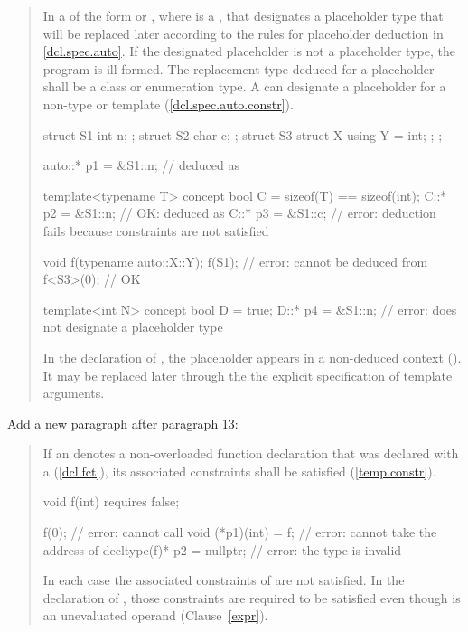 \begin{quote}
\setcounter{Paras}{11}
\pnum
In a  of the form  or
, where  is a ,
that  designates a placeholder type that 
will be replaced later according to the rules for placeholder deduction in
\ref{dcl.spec.auto}.
%
If the designated placeholder is not a placeholder type, the program is
ill-formed.
% 
The replacement type deduced for a placeholder shall be a class or
enumeration type.
% 
\enternote
A  can designate a placeholder for
a non-type or template (\ref{dcl.spec.auto.constr}).
\exitnote
% 
\enterexample
\begin{codeblock}
struct S1 { int n; };
struct S2 { char c; };
struct S3 { struct X { using Y = int; }; };

auto::* p1 = &S1::n; //  deduced as 

template<typename T> concept bool C = sizeof(T) == sizeof(int);
C::* p2 = &S1::n; // OK:  deduced as 
C::* p3 = &S1::c; // error: deduction fails because constraints are not satisfied

void f(typename auto::X::Y);
f(S1);    // error:  cannot be deduced from 
f<S3>(0); // OK

template<int N> concept bool D = true;
D::* p4 = &S1::n; // error:  does not designate a placeholder type
\end{codeblock}
In the declaration of , the placeholder appears in a non-deduced 
context (). It may be replaced later through the
the explicit specification of template arguments.
\exitexample
\end{quote}

Add a new paragraph after paragraph 13:

\begin{quote}
\setcounter{Paras}{13}
\pnum
If an  denotes a non-overloaded function 
declaration that was declared with a 
(\ref{dcl.fct}), its associated constraints shall be satisfied
(\ref{temp.constr}).
\enterexample
\begin{codeblock}
void f(int) requires false;

f(0);                      // error: cannot call 
void (*p1)(int) = f;       // error: cannot take the address of 
decltype(f)* p2 = nullptr; // error: the type  is invalid
\end{codeblock}
In each case the associated constraints of  are not satisfied. In the 
declaration of , those constraints are required to be satisfied even 
though  is an unevaluated operand (Clause~\ref{expr}).
\exitexample
\end{quote}


